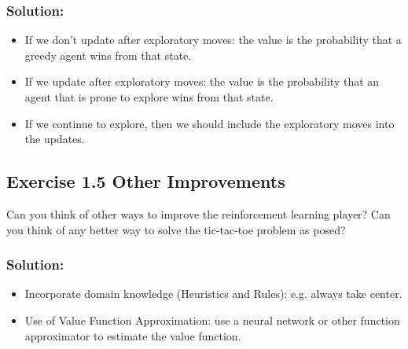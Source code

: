\subsubsection*{Solution:}
\begin{itemize}
    \item If we don't update after exploratory moves: the value is the probability that a greedy agent wins from that state.
    \item If we update after exploratory moves: the value is the probability that an agent that is prone to explore wins from that state.
    \item If we continue to explore, then we should include the exploratory moves into the updates.
\end{itemize}

\subsection*{Exercise 1.5 Other Improvements} 
Can you think of other ways to improve the reinforcement learning player? Can you think of any better way to solve the tic-tac-toe problem
as posed?

\subsubsection*{Solution:}
\begin{itemize}
    \item Incorporate domain knowledge (Heuristics and Rules): e.g. always take center.
    \item Use of Value Function Approximation: use a neural network or other function approximator to estimate the value function.
\end{itemize}